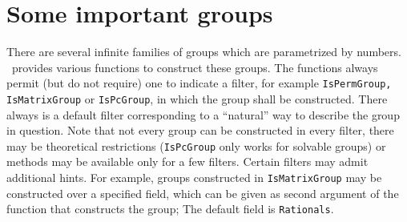 \newpage 

\section{Some important groups\protect\footnotemark}  
There are several infinite families of groups which are parametrized by numbers. \gap\
provides various functions to construct these groups. The functions always permit
(but do not require) one to indicate a 
filter, for example {\tt IsPermGroup, IsMatrixGroup} or {\tt IsPcGroup}, in which the
group shall be constructed. 
There always is a default filter corresponding to a ``natural'' way to describe the
group in question. Note that not every group can be constructed in every filter,
there may be theoretical restrictions ({\tt IsPcGroup} only works for solvable
groups) or methods may be available only for a few filters. 
Certain filters may admit additional hints. For example, groups constructed in
{\tt IsMatrixGroup} may be constructed over a specified field, which can be given as
second argument of the function that constructs the group; The default field is
{\tt Rationals}.
